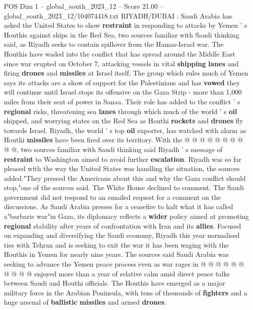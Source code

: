 \begin{textsample}{POS Dim 1 – global\_south\_2023\_12 – Score 21.00 – global\_south\_2023\_12/104074418.txt}  \label{ex:f1_pos_163}
RIYADH/DUBAI : Saudi Arabia has asked the United States to show \textbf{restraint} in responding to attacks by Yemen ' s Houthis against ships in the Red Sea, two sources familiar with Saudi thinking said, as Riyadh seeks to contain spillover from the Hamas-Israel war.
The Houthis have waded into the conflict that has spread around the Middle East since war erupted on October 7, attacking vessels in vital \textbf{shipping} \textbf{lanes} and firing \textbf{drones} and \textbf{missiles} at Israel itself.
The group which rules much of Yemen says its attacks are a show of support for the Palestinians and has \textbf{vowed} they will continue until Israel stops its offensive on the Gaza Strip - more than 1,000 miles from their seat of power in Sanaa.
Their role has added to the conflict ' s \textbf{regional} risks, threatening sea \textbf{lanes} through which much of the world ' s \textbf{oil} shipped, and worrying states on the Red Sea as Houthi \textbf{rockets} and \textbf{drones} fly towards Israel.
Riyadh, the world ' s top \textbf{oil} exporter, has watched with alarm as Houthi \textbf{missiles} have been fired over its territory.
With the @ @ @ @ @ @ @ @ @ @, two sources familiar with Saudi thinking said Riyadh ' s message of \textbf{restraint} to Washington aimed to avoid further \textbf{escalation}.
Riyadh was so far pleased with the way the United States was handling the situation, the sources added."They pressed the Americans about this and why the Gaza conflict should stop,"one of the sources said.
The White House declined to comment.
The Saudi government did not respond to an emailed request for a comment on the discussions.
As Saudi Arabia presses for a ceasefire to halt what it has called a"barbaric war"in Gaza, its diplomacy reflects a \textbf{wider} policy aimed at promoting \textbf{regional} stability after years of confrontation with Iran and its \textbf{allies}.
Focused on expanding and diversifying the Saudi economy, Riyadh this year normalised ties with Tehran and is seeking to exit the war it has been waging with the Houthis in Yemen for nearly nine years.
The sources said Saudi Arabia was seeking to advance the Yemen peace process even as war rages in @ @ @ @ @ @ @ @ @ @ enjoyed more than a year of relative calm amid direct peace talks between Saudi and Houthi officials.
The Houthis have emerged as a major military force in the Arabian Peninsula, with tens of thousands of \textbf{fighters} and a huge arsenal of \textbf{ballistic} \textbf{missiles} and armed \textbf{drones}.

\end{textsample}

